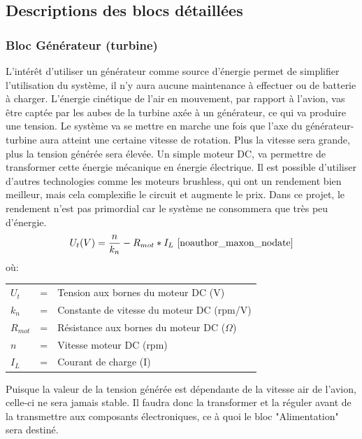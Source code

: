 \subsection{Descriptions des blocs détaillées}
    
    \subsubsection{Bloc Générateur (turbine)}
        L’intérêt d’utiliser un générateur comme source d'énergie permet de simplifier l’utilisation du système, il n'y aura aucune maintenance à effectuer ou de batterie à charger. L'énergie cinétique de l'air en mouvement, par rapport à l'avion, vas être captée par les aubes de la turbine axée à un générateur, ce qui va produire une tension. Le système va se mettre en marche une fois que l'axe du générateur-turbine aura atteint une certaine vitesse de rotation. Plus la vitesse sera grande, plus la tension générée sera élevée. Un simple moteur DC, va permettre de transformer cette énergie mécanique en énergie électrique. Il est possible d'utiliser d'autres technologies comme les moteurs brushless, qui ont un rendement bien meilleur, mais cela complexifie le circuit et augmente le prix. Dans ce projet, le rendement n'est pas primordial car le système ne consommera que très peu d'énergie.
        \begin{equation}
            U_{t}(V) = \frac{n}{k_{n}}-R_{mot}*I_{L} \text{ \cite{noauthor_maxon_nodate}}
        \end{equation}
        où:
        
        \begin{tabular}{l l l}
            $U_{t}$ & = & Tension aux bornes du moteur DC (V) \\
            $k_{n}$ & = & Constante de vitesse du moteur DC (rpm/V) \\
            $R_{mot}$ & = & Résistance aux bornes du moteur DC ($\Omega$) \\
            $n$ & = & Vitesse moteur DC (rpm) \\
            $I_{L}$ & = & Courant de charge (I) \\
        \end{tabular}
        \vspace{0.5 cm}
        \noindent Puisque la valeur de la tension générée est dépendante de la vitesse air de l'avion, celle-ci ne sera jamais stable. Il faudra donc la transformer et la réguler avant de la transmettre aux composants électroniques, ce à quoi le bloc "Alimentation" sera destiné.
        
